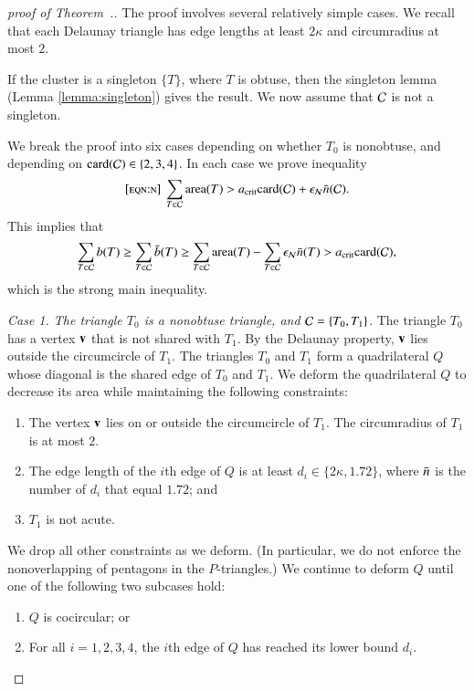 \begin{proof}[proof of Theorem~.]
  The proof involves several relatively simple cases.  
  We recall that each Delaunay triangle has edge lengths at
  least $2\kappa$ and circumradius at most $2$.

  If the cluster is a singleton $\{T\}$, where $T$ is obtuse, then the
  singleton lemma (Lemma \ref{lemma:singleton}) gives the result.  We
  now assume that $\mathcal C$ is not a singleton.


We break the proof into six cases depending on whether $T_0$ is
nonobtuse, and depending on ${\operatorname{card}}(\mathcal C)\in \{2,3,4\}$.
In each case we prove inequality 
\begin{equation}\libel{eqn:n}
\sum_{T\in \C} \area(T) > \acrit \card(\C) + \epsN \tn(\C).
\end{equation}
    This implies that
\[
\sum_{T\in\mathcal C} b(T) \ge \sum_{T\in\mathcal C} \bar b(T) 
\ge \sum_{T\in\mathcal C}{\operatorname{area}}(T) - \sum_{T\in\mathcal C} \epsilon_{\mathcal N}\bar n(T) 
> a_\text{crit} {\operatorname{card}}(\mathcal C),
\]
which is the strong main inequality.

{\it Case 1. The triangle $T_0$ is a nonobtuse triangle, and
  $\mathcal C=\{T_0,T_1\}$.}  The triangle $T_0$ has a vertex ${\mathbf v}$ that is
not shared with $T_1$.  By the Delaunay property, ${\mathbf v}$ lies outside
the circumcircle of $T_1$.  The triangles $T_0$ and $T_1$ form a
quadrilateral $Q$ whose diagonal is the shared edge of $T_0$ and
$T_1$.  We deform the quadrilateral $Q$ to decrease its area while
maintaining the following constraints:
\begin{enumerate}
\item The vertex ${\mathbf v}$ lies on or outside the circumcircle of
  $T_1$. The circumradius of $T_1$ is at most $2$.
\item The edge length of the $i$th edge of $Q$ is at least
  $d_i\in\{2\kappa,1.72\}$,
where $\bar n$ is the number of $d_i$ that equal $1.72$; and
\item $T_1$ is not acute.
\end{enumerate}
We drop all other constraints as we deform. (In particular, we do not
enforce the nonoverlapping of pentagons in the $P$-triangles.)  We
continue to deform $Q$ until one of the following two subcases hold:
\begin{enumerate}
\item $Q$ is cocircular; or
\item For all $i=1,2,3,4$, the $i$th edge of $Q$ has reached its lower
  bound $d_i$.
\end{enumerate}


\end{proof}
